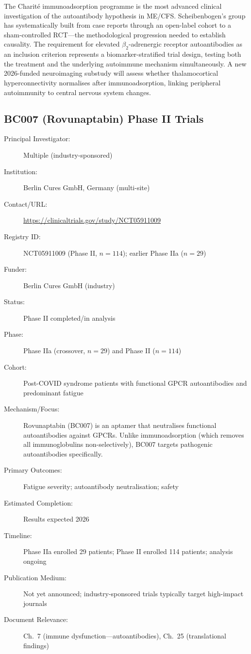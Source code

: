 The Charit\'{e} immunoadsorption programme is the most advanced clinical
investigation of the autoantibody hypothesis in ME/CFS.  Scheibenbogen's group
has systematically built from case reports through an open-label cohort to a
sham-controlled RCT---the methodological progression needed to establish
causality.  The requirement for elevated $\beta_2$-adrenergic receptor
autoantibodies as an inclusion criterion represents a biomarker-stratified
trial design, testing both the treatment and the underlying autoimmune
mechanism simultaneously.  A new 2026-funded neuroimaging substudy will
assess whether thalamocortical hyperconnectivity normalises after
immunoadsorption, linking peripheral autoimmunity to central nervous system
changes.

\subsection{BC007 (Rovunaptabin) Phase II Trials}
\label{sec:registry-bc007}

\begin{description}
    \item[Principal Investigator:] Multiple (industry-sponsored)
    \item[Institution:] Berlin Cures GmbH, Germany (multi-site)
    \item[Contact/URL:] \url{https://clinicaltrials.gov/study/NCT05911009}
    \item[Registry ID:] NCT05911009 (Phase II, $n=114$); earlier Phase IIa
        ($n=29$)
    \item[Funder:] Berlin Cures GmbH (industry)
    \item[Status:] Phase II completed/in analysis
    \item[Phase:] Phase IIa (crossover, $n=29$) and Phase II ($n=114$)
    \item[Cohort:] Post-COVID syndrome patients with functional GPCR
        autoantibodies and predominant fatigue
    \item[Mechanism/Focus:] Rovunaptabin (BC007) is an aptamer that
        neutralises functional autoantibodies against GPCRs.  Unlike
        immunoadsorption (which removes all immunoglobulins non-selectively),
        BC007 targets pathogenic autoantibodies specifically.
    \item[Primary Outcomes:] Fatigue severity; autoantibody neutralisation;
        safety
    \item[Estimated Completion:] Results expected 2026
    \item[Timeline:] Phase IIa enrolled 29 patients; Phase II enrolled 114
        patients; analysis ongoing
    \item[Publication Medium:] Not yet announced; industry-sponsored trials
        typically target high-impact journals
    \item[Document Relevance:] Ch.~7 (immune dysfunction---autoantibodies),
        Ch.~25 (translational findings)
\end{description}


